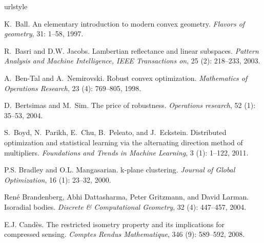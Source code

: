 \documentclass{ctexart}
\begin{document}
\begin{thebibliography}{47}
    \providecommand{\natexlab}[1]{#1}
    \providecommand{\url}[1]{\texttt{#1}}
    \expandafter\ifx\csname urlstyle\endcsname\relax
    \providecommand{\doi}[1]{doi: #1}\else
    \providecommand{\doi}{doi: \begingroup \urlstyle{rm}\Url}\fi

    K.~Ball.
    \newblock An elementary introduction to modern convex geometry.
    \newblock \emph{Flavors of geometry}, 31: 1--58, 1997.

    R.~Basri and D.W. Jacobs.
    \newblock Lambertian reflectance and linear subspaces.
    \newblock \emph{Pattern Analysis and Machine Intelligence, IEEE Transactions
    on}, 25 (2): 218--233, 2003.

    A.~Ben-Tal and A.~Nemirovski.
    \newblock Robust convex optimization.
    \newblock \emph{Mathematics of Operations Research}, 23 (4):
    769--805, 1998.

    D.~Bertsimas and M.~Sim.
    \newblock The price of robustness.
    \newblock \emph{Operations research}, 52 (1): 35--53, 2004.

    S.~Boyd, N.~Parikh, E.~Chu, B.~Peleato, and J.~Eckstein.
    \newblock Distributed optimization and statistical learning via the alternating
    direction method of multipliers.
    \newblock \emph{Foundations and Trends{\textregistered} in Machine Learning},
    3 (1): 1--122, 2011.

    P.S. Bradley and O.L. Mangasarian.
    \newblock k-plane clustering.
    \newblock \emph{Journal of Global Optimization}, 16 (1):
    23--32, 2000.

    Ren{\'e} Brandenberg, Abhi Dattasharma, Peter Gritzmann, and David Larman.
    \newblock Isoradial bodies.
    \newblock \emph{Discrete \& Computational Geometry}, 32 (4):
    447--457, 2004.

    E.J. Cand{\`e}s.
    \newblock The restricted isometry property and its implications for compressed
    sensing.
    \newblock \emph{Comptes Rendus Mathematique}, 346 (9):
    589--592, 2008.


\end{thebibliography}
\end{document}
